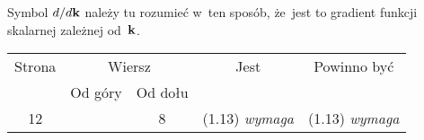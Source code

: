 \documentclass[a4paper,11pt]{article}
\numberwithin{equation}{section}
\begin{document}
\noindent
{} Symbol $d / d\mathbf{k}$ należy tu rozumieć w~ten sposób,
że~jest to gradient funkcji skalarnej zależnej od~$\mathbf{k}$.






\newpage



\begin{center}

  \begin{tabular}{|c|c|c|c|c|}
    \hline
    Strona & \multicolumn{2}{c|}{Wiersz} & Jest
                              & Powinno być \\ \cline{2-3}
    & Od góry & Od dołu & & \\ \hline
    12 & & 8 & (1.13){ }{ }\textit{wymaga} & (1.13) \textit{wymaga} \\
    \hline
  \end{tabular}

\end{center}

\vspace{\spaceTwo}



















{}





\end{document}

